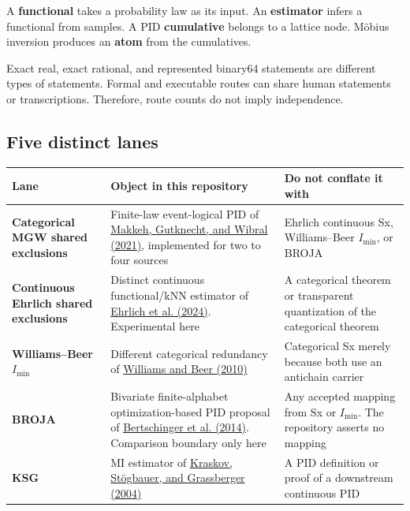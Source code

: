 \documentclass[
  11pt,
  a4paper,
]{article}
\newcounter{none} %
\begin{document}
A \textbf{functional} takes a probability law as its input. An
\textbf{estimator} infers a functional from samples. A PID
\textbf{cumulative} belongs to a lattice node. Möbius inversion produces
an \textbf{atom} from the cumulatives.

Exact real, exact rational, and represented binary64 statements are
different types of statements. Formal and executable routes can share
human statements or transcriptions. Therefore, route counts do not imply
independence.


\subsection{Five distinct lanes}\label{five-distinct-lanes}

{\def\LTcaptype{none} %
\begin{longtable}[]{@{}
  >{\raggedright\arraybackslash}p{}
  >{\raggedright\arraybackslash}p{}
  >{\raggedright\arraybackslash}p{}@{}}
\toprule\noalign{}
\begin{minipage}[b]{\linewidth}\raggedright
Lane
\end{minipage} & \begin{minipage}[b]{\linewidth}\raggedright
Object in this repository
\end{minipage} & \begin{minipage}[b]{\linewidth}\raggedright
Do not conflate it with
\end{minipage} \\
\midrule\noalign{}
\endhead
\bottomrule\noalign{}
\endlastfoot
\textbf{Categorical MGW shared exclusions} & Finite-law event-logical
PID of \href{https://doi.org/10.1103/PhysRevE.103.032149}{Makkeh,
Gutknecht, and Wibral (2021)}, implemented for two to four sources &
Ehrlich continuous Sx, Williams--Beer \(I_{\min}\), or BROJA \\
\textbf{Continuous Ehrlich shared exclusions} & Distinct continuous
functional/kNN estimator of
\href{https://doi.org/10.1103/PhysRevE.110.014115}{Ehrlich et al.
(2024)}. Experimental here & A categorical theorem or transparent
quantization of the categorical theorem \\
\textbf{Williams--Beer \(I_{\min}\)} & Different categorical redundancy
of \href{https://arxiv.org/abs/1004.2515}{Williams and Beer (2010)} &
Categorical Sx merely because both use an antichain carrier \\
\textbf{BROJA} & Bivariate finite-alphabet optimization-based PID
proposal of \href{https://doi.org/10.3390/e16042161}{Bertschinger et al.
(2014)}. Comparison boundary only here & Any accepted mapping from Sx or
\(I_{\min}\). The repository asserts no mapping \\
\textbf{KSG} & MI estimator of
\href{https://doi.org/10.1103/PhysRevE.69.066138}{Kraskov, Stögbauer,
and Grassberger (2004)} & A PID definition or proof of a downstream
continuous PID \\
\end{longtable}
}
\end{document}
